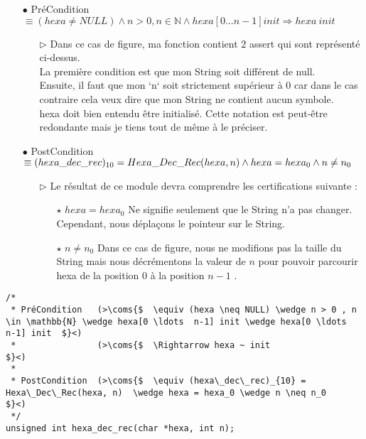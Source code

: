 \documentclass[a4paper, 11pt, oneside]{article}
\newcommand{\coms}[1]{\textcolor{MidnightBlue}{#1}}
\begin{document}
	\begin{itemize}
		\item[$\bullet$] PréCondition $\equiv (hexa \neq NULL) \wedge n > 0 , n \in \mathbb{N} \wedge hexa[0 \ldots  n-1] init \Rightarrow hexa ~ init$
		
		\vspace{3mm}
		\begin{itemize}
			\item[$\triangleright$] Dans ce cas de figure, ma fonction contient $2$ assert qui sont représenté ci-dessus. 
						   \\La première condition est que mon String soit différent de null. 
						   \\Ensuite, il faut que mon `n` soit strictement supérieur à $0$ car dans le cas contraire cela veux 
						   	 dire que mon String ne contient aucun symbole.
						   \\hexa doit bien entendu être initialisé. Cette notation est peut-être redondante mais je tiens tout de même à le préciser.					
		\end{itemize}
		\vspace{5mm}
		
		\item[$\bullet$] PostCondition $\equiv (hexa\_dec\_rec)_{10} = Hexa\_Dec\_Rec(hexa, n) 
									 \\ \wedge hexa = hexa_0 \wedge n \neq n_0$
			
		\vspace{3mm}
		\begin{itemize}
			\item[$\triangleright$] Le résultat de ce module devra comprendre les certifications suivante : 
			\begin{itemize}
				\item[$\star$] $hexa = hexa_0$ Ne signifie seulement que le String n'a pas changer.
							   \\ Cependant, nous déplaçons le pointeur sur le String.
				\item[$\star$] $n \neq n_0$ Dans ce cas de figure, nous ne modifions pas la taille du String mais nous décrémentons la valeur de $n$ pour
					  pouvoir parcourir hexa de la position $0$ à la position $n-1$ .
			\end{itemize} 				
		\end{itemize}
	\end{itemize}
		
	\begin{lstlisting}[caption={Spécification}]
/*
 * PréCondition   (>\coms{$  \equiv (hexa \neq NULL) \wedge n > 0 , n \in \mathbb{N} \wedge hexa[0 \ldots  n-1] init \wedge hexa[0 \ldots  n-1] init  $}<) 
 * 				  (>\coms{$  \Rightarrow hexa ~ init																								  $}<) 
 * 
 * PostCondition  (>\coms{$  \equiv (hexa\_dec\_rec)_{10} = Hexa\_Dec\_Rec(hexa, n)  \wedge hexa = hexa_0 \wedge n \neq n_0							  $}<)
 */
unsigned int hexa_dec_rec(char *hexa, int n);

	\end{lstlisting}
\end{document}
